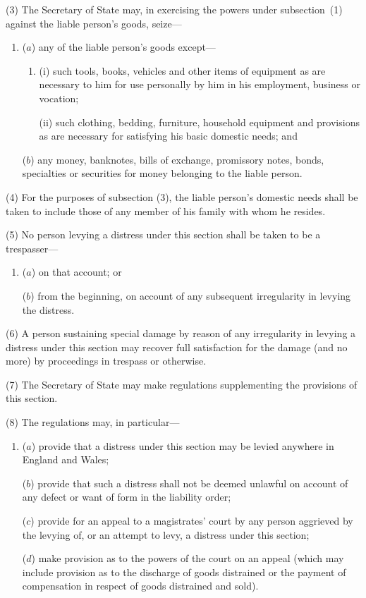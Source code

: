 \documentclass[12pt,a4paper]{article}
\begin{document}
(3) The 
Secretary of State  %
may, in exercising 
the  %
powers under subsection~(1)  against the liable person’s goods, seize—
\begin{enumerate}\item[]
($a$) any of the liable person’s goods except—
\begin{enumerate}\item[]
(i) such tools, books, vehicles and other items of equipment as are necessary to him for use personally by him in his employment, business or vocation;

(ii) such clothing, bedding, furniture, household equipment and provisions as are necessary for satisfying his basic domestic needs; and
\end{enumerate}

($b$) any money, banknotes, bills of exchange, promissory notes, bonds, specialties or securities for money belonging to the liable person.
\end{enumerate}

(4) For the purposes of subsection (3), the liable person’s domestic needs shall be taken to include those of any member of his family with whom he resides.

(5) No person levying a distress under this section shall be taken to be a trespasser—
\begin{enumerate}\item[]
($a$) on that account; or

($b$) from the beginning, on account of any subsequent irregularity in levying the distress.
\end{enumerate}

(6) A person sustaining special damage by reason of any irregularity in levying a distress under this section may recover full satisfaction for the damage (and no more) by proceedings in trespass or otherwise.

(7) The Secretary of State may make regulations supplementing the provisions of this section.

(8) The regulations may, in particular—
\begin{enumerate}\item[]
($a$) provide that a distress under this section may be levied anywhere in England and Wales;

($b$) provide that such a distress shall not be deemed unlawful on account of any defect or want of form in the liability order;

($c$) provide for an appeal to a magistrates' court by any person aggrieved by the levying of, or an attempt to levy, a distress under this section;

($d$) make provision as to the powers of the court on an appeal (which may include provision as to the discharge of goods distrained or the payment of compensation in respect of goods distrained and sold).
\end{enumerate}
\end{document}
